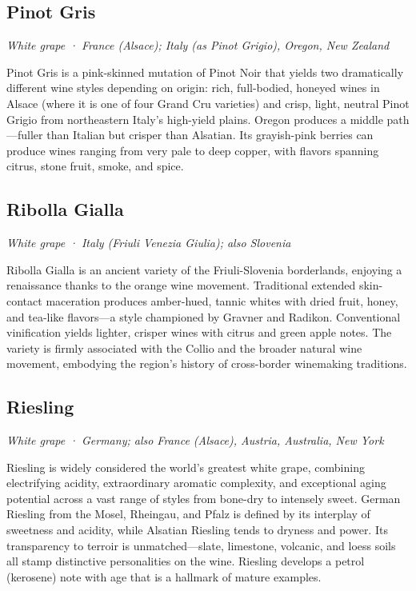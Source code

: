 \subsection*{Pinot Gris}
\textit{White grape · France (Alsace); Italy (as Pinot Grigio), Oregon, New Zealand}\par\smallskip

Pinot Gris is a pink-skinned mutation of Pinot Noir that yields two dramatically different wine styles depending on origin: rich, full-bodied, honeyed wines in Alsace (where it is one of four Grand Cru varieties) and crisp, light, neutral Pinot Grigio from northeastern Italy’s high-yield plains. Oregon produces a middle path—fuller than Italian but crisper than Alsatian. Its grayish-pink berries can produce wines ranging from very pale to deep copper, with flavors spanning citrus, stone fruit, smoke, and spice.

\subsection*{Ribolla Gialla}
\textit{White grape · Italy (Friuli Venezia Giulia); also Slovenia}\par\smallskip

Ribolla Gialla is an ancient variety of the Friuli-Slovenia borderlands, enjoying a renaissance thanks to the orange wine movement. Traditional extended skin-contact maceration produces amber-hued, tannic whites with dried fruit, honey, and tea-like flavors—a style championed by Gravner and Radikon. Conventional vinification yields lighter, crisper wines with citrus and green apple notes. The variety is firmly associated with the Collio and the broader natural wine movement, embodying the region’s history of cross-border winemaking traditions.

\subsection*{Riesling}
\textit{White grape · Germany; also France (Alsace), Austria, Australia, New York}\par\smallskip

Riesling is widely considered the world’s greatest white grape, combining electrifying acidity, extraordinary aromatic complexity, and exceptional aging potential across a vast range of styles from bone-dry to intensely sweet. German Riesling from the Mosel, Rheingau, and Pfalz is defined by its interplay of sweetness and acidity, while Alsatian Riesling tends to dryness and power. Its transparency to terroir is unmatched—slate, limestone, volcanic, and loess soils all stamp distinctive personalities on the wine. Riesling develops a petrol (kerosene) note with age that is a hallmark of mature examples.

